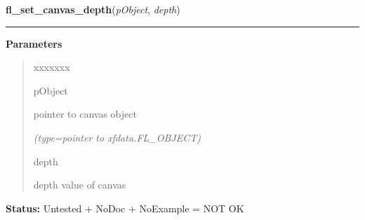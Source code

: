\hspace{.8\funcindent}\begin{boxedminipage}{\funcwidth}

    \raggedright \textbf{fl\_set\_canvas\_depth}(\textit{pObject}, \textit{depth})

    \vspace{-1.5ex}

    \rule{\textwidth}{0.5\fboxrule}
\setlength{\parskip}{2ex}
\setlength{\parskip}{1ex}
      \textbf{Parameters}
      \vspace{-1ex}

      \begin{quote}
        \begin{Ventry}{xxxxxxx}

          \item[pObject]

          pointer to canvas object

            {\it (type=pointer to xfdata.FL\_OBJECT)}

          \item[depth]

          depth value of canvas

        \end{Ventry}

      \end{quote}

\textbf{Status:} Untested + NoDoc + NoExample = NOT OK



    \end{boxedminipage}

    \label{xformslib:library:fl_set_canvas_attributes}

    \vspace{0.5ex}

